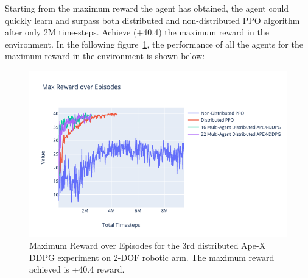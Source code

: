 Starting from the maximum reward the agent has obtained, the agent could quickly learn and surpass both distributed and non-distributed PPO algorithm after only 2M time-steps. Achieve (+40.4) the maximum reward in the environment. In the following figure~\ref{fig:3rd_exp_max_eps_reward}, the performance of all the agents for the maximum reward in the environment is shown below:
\begin{figure}[H] %
	\centering
	\includegraphics[width=1.2\linewidth]{figures/exps/3rd_exp/max_eps_reward.png}
	\caption{Maximum Reward over Episodes for the 3rd distributed Ape-X DDPG experiment on 2-DOF robotic arm. The maximum reward achieved is +40.4 reward.}
	\label{fig:3rd_exp_max_eps_reward}
\end{figure}

